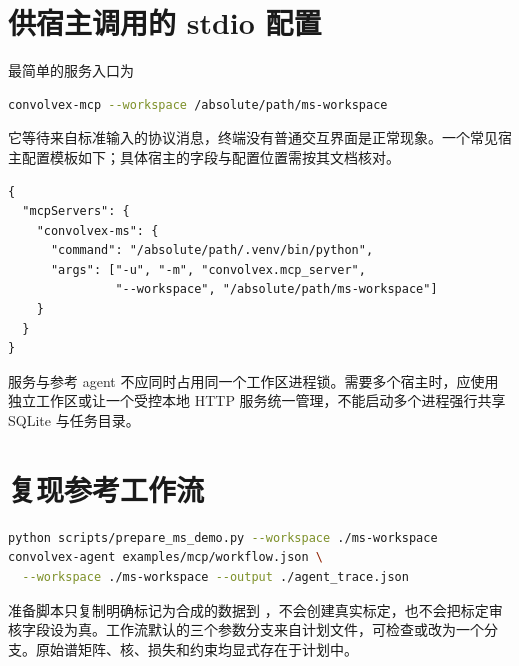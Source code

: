 \section{供宿主调用的 stdio 配置}
最简单的服务入口为
\par\noindent\begin{minipage}{\linewidth}
\begin{lstlisting}[language=bash]
convolvex-mcp --workspace /absolute/path/ms-workspace
\end{lstlisting}
\end{minipage}\par
它等待来自标准输入的协议消息，终端没有普通交互界面是正常现象。一个常见宿主配置模板如下；具体宿主的字段与配置位置需按其文档核对。
\par\noindent\begin{minipage}{\linewidth}
\begin{lstlisting}
{
  "mcpServers": {
    "convolvex-ms": {
      "command": "/absolute/path/.venv/bin/python",
      "args": ["-u", "-m", "convolvex.mcp_server",
               "--workspace", "/absolute/path/ms-workspace"]
    }
  }
}
\end{lstlisting}
\end{minipage}\par
服务与参考 agent 不应同时占用同一个工作区进程锁。需要多个宿主时，应使用独立工作区或让一个受控本地 HTTP 服务统一管理，不能启动多个进程强行共享 SQLite 与任务目录。

\section{复现参考工作流}
\par\noindent\begin{minipage}{\linewidth}
\begin{lstlisting}[language=bash]
python scripts/prepare_ms_demo.py --workspace ./ms-workspace
convolvex-agent examples/mcp/workflow.json \
  --workspace ./ms-workspace --output ./agent_trace.json
\end{lstlisting}
\end{minipage}\par
准备脚本只复制明确标记为合成的数据到 ，不会创建真实标定，也不会把标定审核字段设为真。工作流默认的三个参数分支来自计划文件，可检查或改为一个分支。原始谱矩阵、核、损失和约束均显式存在于计划中。

